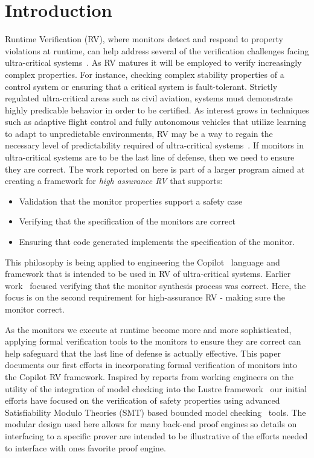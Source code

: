 \section{Introduction}\label{sec:intro}
Runtime Verification (RV), where monitors detect and respond to
property violations at runtime, can help address several of the
verification challenges facing ultra-critical
systems~\cite{pike-rv-11}.  As RV matures it will be employed to
verify increasingly complex properties. For instance, checking complex
stability properties of a control system or ensuring that a critical
system is fault-tolerant.  Strictly regulated ultra-critical areas
such as civil aviation, systems must demonstrate highly predicable
behavior in order to be certified. As interest grows in techniques
such as adaptive flight control and fully autonomous vehicles that
utilize learning to adapt to unpredictable environments, RV may be a
way to regain the necessary level of predictability required of
ultra-critical systems~\cite{simplex}.  If monitors in ultra-critical
systems are to be the last line of defense, then we need to ensure
they are correct. The work reported on here is part of a larger
program aimed at creating a framework for \emph{high assurance RV}
that supports: 
\begin{itemize}
\item Validation that the monitor properties support a safety
case
\item Verifying that the specification of the monitors are correct
\item Ensuring that code generated implements the specification of the
monitor. 
\end{itemize} 
 This philosophy is being applied to engineering the
Copilot~\cite{copilot,pike-isse-13} language and framework that is
intended to be used in RV of ultra-critical systems.  Earlier
work~\cite{pike-icfp-12} focused verifying that the monitor synthesis
process was correct. Here, the focus is on the second requirement for
high-assurance RV - making sure the monitor  correct. 

                                     
 As the monitors we execute at runtime become more and more
sophisticated, applying formal verification tools to the monitors to
ensure they are correct can help safeguard that the last line of
defense is actually effective.   This paper documents our first efforts
in incorporating formal verification of monitors  into the Copilot RV framework.
Inspired by reports from working engineers on the utility of the
integration of model checking into the Lustre framework~\cite{Hagen08}
our initial efforts have focused on the verification of safety
properties using advanced Satisfiability Modulo Theories (SMT) based
bounded model checking~\cite{ClarkeBounded01} tools. The modular
design used here allows for many back-end proof engines so details on
interfacing to a specific prover are intended to be illustrative of
the efforts needed to interface with ones favorite proof engine. 


